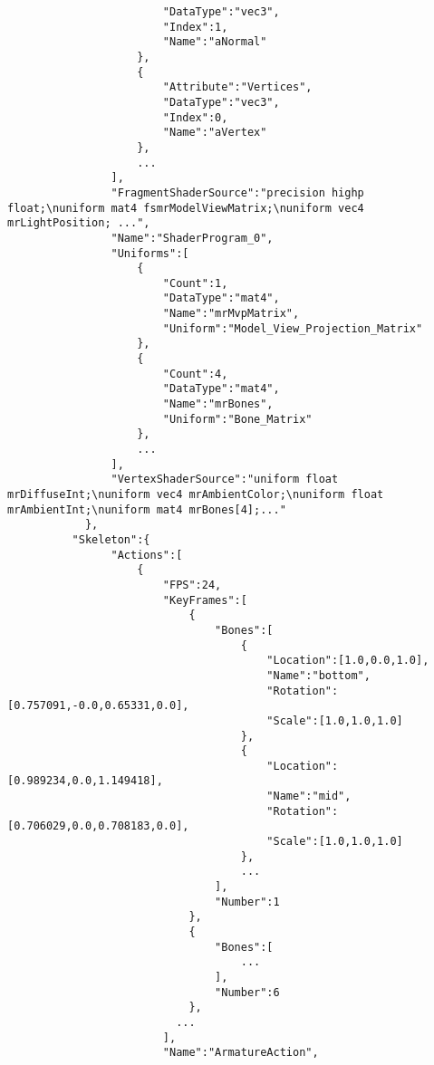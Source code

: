 \begin{verbatim}
                        "DataType":"vec3",
                        "Index":1,
                        "Name":"aNormal"
                    },
                    {
                        "Attribute":"Vertices",
                        "DataType":"vec3",
                        "Index":0,
                        "Name":"aVertex"
                    },
                    ...
                ],
                "FragmentShaderSource":"precision highp float;\nuniform mat4 fsmrModelViewMatrix;\nuniform vec4 mrLightPosition; ...",
                "Name":"ShaderProgram_0",
                "Uniforms":[
                    {
                        "Count":1,
                        "DataType":"mat4",
                        "Name":"mrMvpMatrix",
                        "Uniform":"Model_View_Projection_Matrix"
                    },
                    {
                        "Count":4,
                        "DataType":"mat4",
                        "Name":"mrBones",
                        "Uniform":"Bone_Matrix"
                    },
                    ...
                ],
                "VertexShaderSource":"uniform float mrDiffuseInt;\nuniform vec4 mrAmbientColor;\nuniform float mrAmbientInt;\nuniform mat4 mrBones[4];..."
            },
          "Skeleton":{
                "Actions":[
                    {
                        "FPS":24,
                        "KeyFrames":[
                            {
                                "Bones":[
                                    {
                                        "Location":[1.0,0.0,1.0],
                                        "Name":"bottom",
                                        "Rotation":[0.757091,-0.0,0.65331,0.0],
                                        "Scale":[1.0,1.0,1.0]
                                    },
                                    {
                                        "Location":[0.989234,0.0,1.149418],
                                        "Name":"mid",
                                        "Rotation":[0.706029,0.0,0.708183,0.0],
                                        "Scale":[1.0,1.0,1.0]
                                    },
                                    ...
                                ],
                                "Number":1
                            },
                            {
                                "Bones":[
                                    ...
                                ],
                                "Number":6
                            },
                          ...
                        ],
                        "Name":"ArmatureAction",

\end{verbatim}
